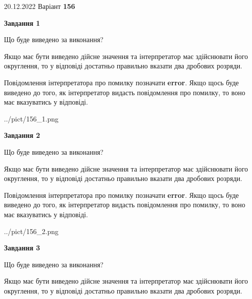 \documentclass[12pt, ukrainian]{article}
\begin{document}
{20.12.2022 Варіант \No \textbf { 156 }\par}
{
\begin {Large}

{\begin {center}\textbf{Завдання 1}\end {center}}\par
Що буде виведено за виконання? \par

Якщо має бути виведено дійсне значення та інтерпретатор має здійснювати його округлення, 
то у відповіді достатньо правильно вказати два дробових розряди.

Повідомлення інтерпретатора про помилку позначати \textbf{error}.
Якщо щось буде виведено до того, як інтерпретатор видасть повідомлення про помилку, 
то воно має вказуватись у відповіді. \par

\begin{center}
	{../pict/156_1.png}
\end{center}
\newpage

{\begin {center}\textbf{Завдання 2}\end {center}}\par
Що буде виведено за виконання? \par

Якщо має бути виведено дійсне значення та інтерпретатор має здійснювати його округлення, 
то у відповіді достатньо правильно вказати два дробових розряди.

Повідомлення інтерпретатора про помилку позначати \textbf{error}.
Якщо щось буде виведено до того, як інтерпретатор видасть повідомлення про помилку, 
то воно має вказуватись у відповіді. \par

\begin{center}
	{../pict/156_2.png}
\end{center}
\newpage

{\begin {center}\textbf{Завдання 3}\end {center}}\par
Що буде виведено за виконання? \par

Якщо має бути виведено дійсне значення та інтерпретатор має здійснювати його округлення, 
то у відповіді достатньо правильно вказати два дробових розряди.


\end{Large}}
\end{document}
